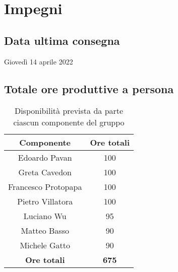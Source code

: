 \section{Impegni}
\subsection{Data ultima consegna}
Giovedì 14 aprile 2022
\subsection{Totale ore produttive a persona}
\begin{center}
\begin{table}[!htbp]
	\centering
    \begin{tabular}{c|c}
	\toprule
    \textbf{Componente} & \textbf{Ore totali} \\
    \midrule
    \rowcolor{gray!10} Edoardo Pavan & 100 \\ 
    \hline
    Greta Cavedon & 100 \\ 
    \hline
    \rowcolor{gray!10} Francesco Protopapa &  100 \\
    \hline
    Pietro Villatora &  100 \\
    \hline
    \rowcolor{gray!10}  Luciano Wu & 95\\
    \hline
    Matteo Basso &  90\\
    \hline
    \rowcolor{gray!10}  Michele Gatto & 90\\
    \hline \hline
    \textbf{Ore totali} & \textbf{675}  \\
    \bottomrule
    
    \end{tabular}
    \caption{Disponibilità prevista da parte ciascun componente del gruppo}
\end{table}
\end{center}

